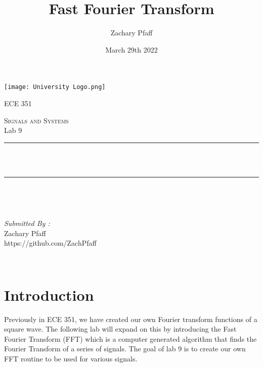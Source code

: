 \documentclass[12pt]{report}
\title{Fast Fourier Transform}
\author{Zachary Pfaff}
\date{March 29th 2022}
\makeatletter
\let\thetitle\@title
\makeatother
\begin{document}
\begin{titlepage}
\centering
\vspace*{0.5 cm}
\texttt{[image: University Logo.png]}\\
\begin{center}    \textsc{\Large   ECE 351}\\[2.0 cm]
\end{center}%
\textsc{\Large Signals and Systems  }\\[0.5 cm] %
Lab 9
\rule{\linewidth}{0.2 mm} \\[0.4 cm]
{ \huge \bfseries \thetitle}\\
\rule{\linewidth}{0.2 mm} \\[1.5 cm]
\begin{minipage}{0.4\textwidth}
\begin{flushleft} \large
\end{flushleft}
\end{minipage}~
\begin{minipage}{0.4\textwidth}
\begin{flushright} \large
\emph{Submitted By :} \\
Zachary Pfaff\\https://github.com/ZachPfaff
\end{flushright}
\end{minipage}\\[2 cm]
\end{titlepage}
\tableofcontents
\pagebreak
\renewcommand{\thesection}{\arabic{section}}
\setlength{\parindent}{20pt}

\maketitle
\section{Introduction}
\hspace{\parindent}Previously in ECE 351, we have created our own Fourier transform functions of a square wave. The following lab will expand on this by introducing the Fast Fourier Transform (FFT) which is a computer generated algorithm that finds the Fourier Transform of a series of signals. The goal of lab 9 is to create our own FFT routine to be used for various signals. \par
\end{document}
